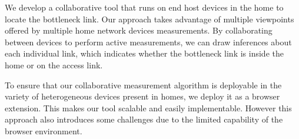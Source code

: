 We develop a collaborative tool that runs on end host devices in the home to locate the bottleneck link. Our approach takes advantage of multiple viewpoints offered by multiple home network devices measurements. By collaborating between devices to perform active measurements, we can draw inferences about each individual link, which indicates whether the bottleneck link is inside the home or on the access link.

To ensure that our collaborative measurement algorithm is deployable in the variety of heterogeneous devices present in homes, we deploy it as a browser extension. This makes our tool scalable and easily implementable. However this approach also introduces some challenges due to the limited capability of the browser environment.
